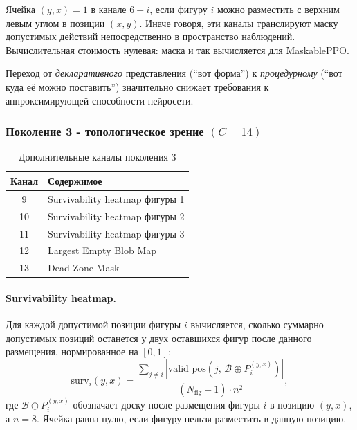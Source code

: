 \documentclass[12pt, a4paper]{article}
\begin{document}
Ячейка $(y,x)=1$ в канале $6+i$, если фигуру $i$ можно разместить с верхним левым углом в позиции $(x,y)$. Иначе говоря, эти каналы транслируют маску допустимых действий непосредственно в пространство наблюдений. Вычислительная стоимость нулевая: маска и так вычисляется для MaskablePPO.

Переход от \textit{декларативного} представления (``вот форма'') к \textit{процедурному} (``вот куда её можно поставить'') значительно снижает требования к аппроксимирующей способности нейросети.

\subsubsection{Поколение 3 - топологическое зрение $(C=14)$}

\begin{table}[H]
  \centering
  \caption{Дополнительные каналы поколения 3}
  \label{tab:obs_gen3}
  \begin{tabular}{cl}
    \toprule
    \textbf{Канал} & \textbf{Содержимое} \\
    \midrule
    9  & Survivability heatmap фигуры 1 \\
    10 & Survivability heatmap фигуры 2 \\
    11 & Survivability heatmap фигуры 3 \\
    12 & Largest Empty Blob Map \\
    13 & Dead Zone Mask \\
    \bottomrule
  \end{tabular}
\end{table}

\paragraph{Survivability heatmap.}
Для каждой допустимой позиции фигуры $i$ вычисляется, сколько суммарно допустимых позиций останется у двух оставшихся фигур после данного размещения, нормированное на $[0,1]$:
\begin{equation}
  \text{surv}_i(y,x)
  = \frac{\displaystyle\sum_{j \neq i} |\text{valid\_pos}(j,\, \mathcal{B} \oplus P_i^{(y,x)})|}{(N_{\text{fig}}-1)\cdot n^2},
  \label{eq:surv}
\end{equation}
где $\mathcal{B} \oplus P_i^{(y,x)}$ обозначает доску после размещения фигуры $i$ в позицию $(y,x)$, а $n=8$. Ячейка равна нулю, если фигуру нельзя разместить в данную позицию.
\end{document}
